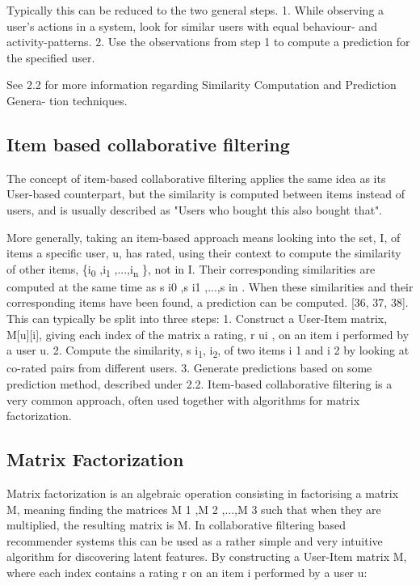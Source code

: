 Typically this can be reduced to the two general steps. 
1. While observing a user’s actions in a system, look for similar users with equal behaviour- and activity-patterns. 
2. Use the observations from step 1 to compute a prediction for the specified user. 

See 2.2 for more information regarding Similarity Computation and Prediction Genera- tion techniques.

\subsection{Item based collaborative filtering}
The concept of item-based collaborative filtering applies the same idea as its User-based counterpart, but the similarity is computed between items instead of users, and is usually described as "Users who bought this also bought that". 

More generally, taking an item-based approach means looking into the set, I, of items a specific user, u, has rated, using their context to compute the similarity of other items, \{i\textsubscript{0} ,i\textsubscript{1} ,...,i\textsubscript{n} \}, not in I. Their corresponding similarities are computed at the same time as {s i0 ,s i1 ,...,s in }. When these similarities and their corresponding items have been found, a prediction can be computed. [36, 37, 38]. 
This can typically be split into three steps: 
1. Construct a User-Item matrix, M[u][i], giving each index of the matrix a rating, r ui , on an item i performed by a user u. 
2. Compute the similarity, s i\textsubscript{1}, i\textsubscript{2}, of two items i 1 and i 2 by looking at co-rated pairs from different users.
3. Generate predictions based on some prediction method, described under 2.2. Item-based collaborative filtering is a very common approach, often used together with algorithms for matrix factorization.

\subsection{Matrix Factorization}
Matrix factorization is an algebraic operation consisting in factorising a matrix M, meaning finding the matrices M 1 ,M 2 ,...,M 3 such that when they are multiplied, the resulting matrix is M. In collaborative filtering based recommender systems this can be used as a rather simple and very intuitive algorithm for discovering latent features. By constructing a User-Item matrix M, where each index contains a rating r on an item i performed by a user u:

